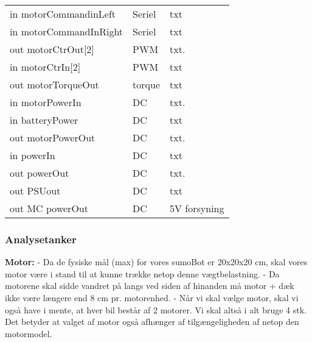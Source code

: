\begin{table*}[]
\begin{tabular}{lp{5cm}p{7cm}}
        in motorCommandinLeft      & Seriel                        & txt                                                                                              \\
        in motorCommandInRight   & Seriel                          & txt 
                 \\
        out motorCtrOut[2]      & PWM                             & txt.&                                                                                          \\
        in motorCtrIn[2]         & PWM                               & txt 
                \\
        out motorTorqueOut    & torque                               & txt 
                \\
        in motorPowerIn        & DC                             & txt.& 
                \\
        in batteryPower        & DC                               & txt 
                \\
        out motorPowerOut      & DC                           & txt.& 
                \\
        in powerIn             & DC                               & txt 
                \\
        out powerOut           & DC                              & txt.& 
                \\
        out PSUout             & DC                               & txt 
                \\
        out MC powerOut        & DC                               & 5V forsyning 
                \\
    \end{tabular}%
\end{table*}

\subsubsection{Analysetanker}

\textbf{Motor:}
- Da de fysiske mål (max) for vores sumoBot er 20x20x20 cm, skal vores motor være i stand til at kunne trække netop denne vægtbelastning.
- Da motorene skal sidde vandret på langs ved siden af hinanden må motor + dæk ikke være længere end 8 cm pr. motorenhed.
- Når vi skal vælge motor, skal vi også have i mente, at hver bil består af 2 motorer. Vi skal altså i alt bruge 4 stk. Det betyder at valget af motor også afhænger af tilgængeligheden af netop den motormodel.


